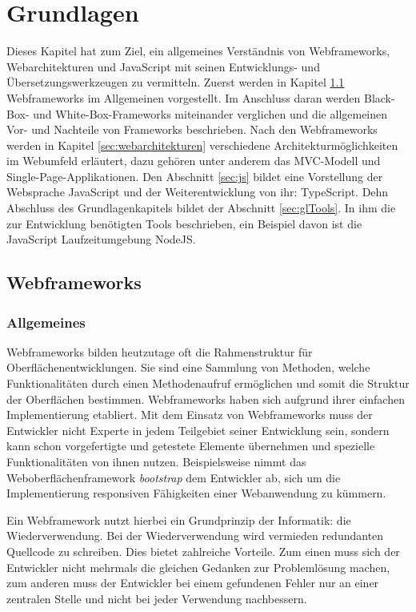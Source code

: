 
\chapter{Grundlagen}

Dieses Kapitel hat zum Ziel, ein allgemeines Verständnis von Webframeworks, Webarchitekturen und JavaScript mit seinen Entwicklungs- und Übersetzungswerkzeugen zu vermitteln. Zuerst werden in Kapitel \ref{sec:webframeworks} Webframeworks im Allgemeinen vorgestellt. Im Anschluss daran werden Black-Box- und White-Box-Frameworks miteinander verglichen und die allgemeinen Vor- und Nachteile von Frameworks beschrieben. Nach den Webframeworks werden in Kapitel \ref{sec:webarchitekturen} verschiedene Architekturmöglichkeiten im Webumfeld erläutert, dazu gehören unter anderem das MVC-Modell und Single-Page-Applikationen. Den Abschnitt \ref{sec:js} bildet eine Vorstellung der Websprache JavaScript und der Weiterentwicklung von ihr: TypeScript. Dehn Abschluss des Grundlagenkapitels bildet der Abschnitt \ref{sec:glTools}. In ihm die zur Entwicklung benötigten Tools beschrieben, ein Beispiel davon ist die JavaScript Laufzeitumgebung NodeJS.

\section{Webframeworks}\label{sec:webframeworks}

\subsection{Allgemeines}

Webframeworks bilden heutzutage oft die Rahmenstruktur für Oberflächenentwicklungen. Sie sind eine Sammlung von Methoden, welche Funktionalitäten durch einen Methodenaufruf ermöglichen und somit die Struktur der Oberflächen bestimmen. Webframeworks haben sich aufgrund ihrer einfachen Implementierung etabliert. Mit dem Einsatz von Webframeworks muss der Entwickler nicht Experte in jedem Teilgebiet seiner Entwicklung sein, sondern kann schon vorgefertigte und getestete Elemente übernehmen und spezielle Funktionalitäten von ihnen nutzen. Beispielsweise nimmt das Weboberflächenframework \textit{bootstrap} dem Entwickler ab, sich um die Implementierung responsiven Fähigkeiten einer Webanwendung zu kümmern.\autocites[vgl.][312\psqq]{Schatten2010}

Ein Webframework nutzt hierbei ein Grundprinzip der Informatik: die Wiederverwendung. Bei der Wiederverwendung wird vermieden redundanten Quellcode zu schreiben. Dies bietet zahlreiche Vorteile. Zum einen muss sich der Entwickler nicht mehrmals die gleichen Gedanken zur Problemlösung machen, zum anderen muss der Entwickler bei einem gefundenen Fehler nur an einer zentralen Stelle und nicht bei jeder Verwendung nachbessern.\autocites[vgl.][302\psqq]{Schatten2010}

